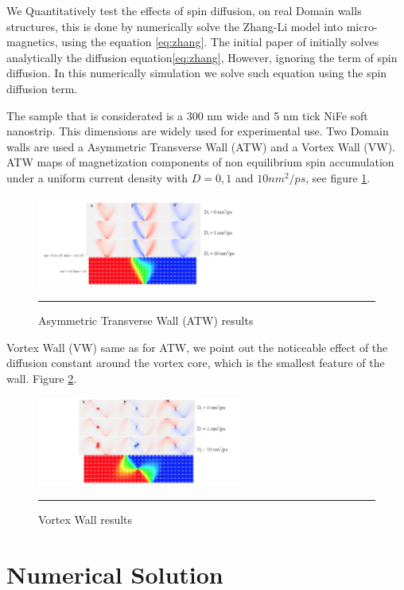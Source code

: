 We Quantitatively test the effects of spin diffusion, on real Domain walls structures, this is done by numerically solve the Zhang-Li model into micro-magnetics, using the equation \ref{eq:zhang}. The initial paper of \cite{zhnag} initially solves analytically the diffusion equation\ref{eq:zhang}, However, ignoring the term of spin diffusion. In this numerically simulation we solve such equation using the spin diffusion term.

The sample that is considerated is a 300 nm wide and 5 nm tick NiFe soft nanostrip. This dimensions are widely used for experimental use. Two Domain walls are used a Asymmetric Transverse Wall (ATW) and a Vortex Wall (VW). ATW maps of magnetization components of non equilibrium spin accumulation under a uniform current density with $D = 0, 1$ and $10 nm^2 / ps$, see figure \ref{fig:atw}.

\begin{figure}[htbp]
	\centering
		\includegraphics[width=0.6\textwidth]{Figures/ATW.png}
		\rule{35em}{0.5pt}
	\caption[Asymmetric Transverse Wall results]{Asymmetric Transverse Wall (ATW) results}
	\label{fig:atw}
\end{figure}

Vortex Wall (VW) same as for ATW, we point out the noticeable effect of the diffusion constant around the vortex core, which is the smallest feature of the wall. Figure \ref{fig:vw}.

\begin{figure}[htbp]
	\centering
		\includegraphics[width=0.6\textwidth]{Figures/VW.png}
		\rule{35em}{0.5pt}
	\caption[Vortex Wall results]{Vortex Wall results}
	\label{fig:vw}
\end{figure}

\section{Numerical Solution}

